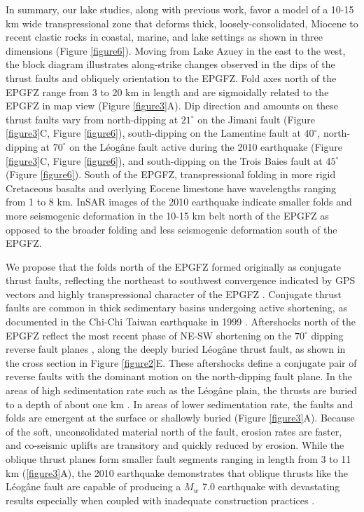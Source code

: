 \documentclass[man,natbib]{apa6}
\begin{document}
In summary, our lake studies, along with previous work, favor a model of a 10-15 km wide transpressional zone that deforms thick, loosely-consolidated, Miocene to recent clastic rocks in coastal, marine, and lake settings as shown in three dimensions (Figure \ref{figure6}). Moving from Lake Azuey in the east to the west, the block diagram illustrates along-strike changes observed in the dips of the thrust faults and obliquely orientation to the EPGFZ. Fold axes north of the EPGFZ range from 3 to 20 km in length and are sigmoidally related to the EPGFZ in map view (Figure \ref{figure3}A). Dip direction and amounts on these thrust faults vary from north-dipping at $21^{\circ}$ on the Jimani fault (Figure \ref{figure3}C, Figure \ref{figure6}), south-dipping on the Lamentine fault \citep{saint2015seismotectonics} at $40^{\circ}$, north-dipping at $70^{\circ}$ on the L\'eog\^ane fault active during the 2010 earthquake (Figure \ref{figure3}C, Figure \ref{figure6}), and south-dipping on the Trois Baies fault at $45^{\circ}$ (Figure \ref{figure6}). South of the EPGFZ, transpressional folding in more rigid Cretaceous basalts and overlying Eocene limestone have wavelengths ranging from 1 to 8 km. InSAR images of the 2010 earthquake indicate smaller folds and more seismogenic deformation in the 10-15 km belt north of the EPGFZ as opposed to the broader folding and less seismogenic deformation south of the EPGFZ. 

We propose that the folds north of the EPGFZ formed originally as conjugate thrust faults, reflecting the northeast to southwest convergence indicated by GPS vectors and highly transpressional character of the EPGFZ \citep{calais2010transpressional}. Conjugate thrust faults are common in thick sedimentary basins undergoing active shortening, as documented in the Chi-Chi Taiwan earthquake in 1999 \citep{chen2002conjugate}. Aftershocks north of the EPGFZ reflect the most recent phase of NE-SW shortening on the $70^{\circ}$ dipping reverse fault planes \citep{nettles2010earthquake}, along the deeply buried L\'eog\^ane thrust fault, as shown in the cross section in Figure \ref{figure2}E. These aftershocks define a conjugate pair of reverse faults with the dominant motion on the north-dipping fault plane. In the areas of high sedimentation rate such as the L\'eog\^ane plain, the thrusts are buried to a depth of about one km \citep{kocel2014searching}. In areas of lower sedimentation rate, the faults and folds are emergent at the surface or shallowly buried (Figure \ref{figure3}A). Because of the soft, unconsolidated material north of the fault, erosion rates are faster, and co-seismic uplifts are transitory and quickly reduced by erosion. While the oblique thrust planes form smaller fault segments ranging in length from 3 to 11 km (\ref{figure3}A), the 2010 earthquake demonstrates that oblique thrusts like the L\'eog\^ane fault are capable of producing a $M_w$ 7.0 earthquake with devastating results especially when coupled with inadequate construction practices \citep{symithe2016present}.
\end{document}
